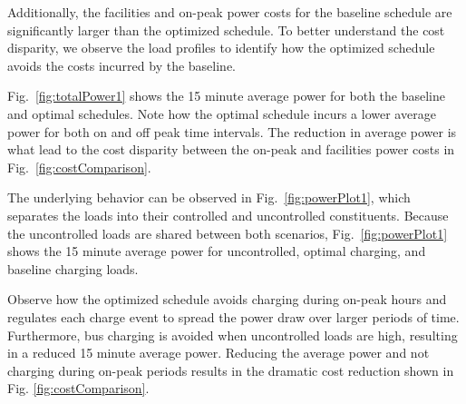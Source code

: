 	\par Additionally, the facilities and on-peak power costs for the baseline schedule are significantly larger than the optimized schedule.  To better understand the cost disparity, we observe the load profiles to identify how the optimized schedule avoids the costs incurred by the baseline.
\par Fig.~\ref{fig:totalPower1} shows the 15 minute average power for both the baseline and optimal schedules. Note how the optimal schedule incurs a lower average power for both on and off peak time intervals. The reduction in average power is what lead to the cost disparity between the on-peak and facilities power costs in Fig.~\ref{fig:costComparison}. 
\par The underlying behavior can be observed in Fig.~\ref{fig:powerPlot1}, which separates the loads into their controlled and uncontrolled constituents. Because the uncontrolled loads are shared between both scenarios, Fig.~\ref{fig:powerPlot1} shows the 15 minute average power for uncontrolled, optimal charging, and baseline charging loads. 
\par Observe how the optimized schedule avoids charging during on-peak hours and regulates each charge event to spread the power draw over larger periods of time. Furthermore, bus charging is avoided when uncontrolled loads are high, resulting in a reduced 15 minute average power.  Reducing the average power and not charging during on-peak periods results in the dramatic cost reduction shown in Fig. \ref{fig:costComparison}.

\begin{figure*}
	\centering
	\caption{15-Minute average power for one day.}
	\label{fig:totalPower1}
\end{figure*} 
\begin{figure*}
	\centering
	\caption{Comparison between uncontrolled and bus loads.}
	\label{fig:powerPlot1}
\end{figure*}

